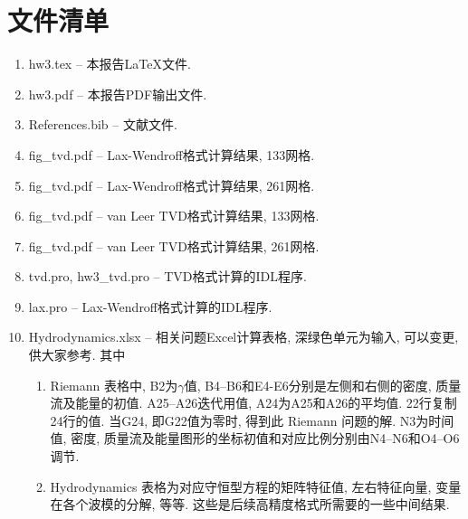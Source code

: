 \documentclass[10.5pt
]{article}
\begin{document}
\section*{文件清单}
\begin{enumerate}
\item
hw3.tex -- 本报告\LaTeX 文件.
\item
hw3.pdf -- 本报告PDF输出文件.
\item
References.bib -- 文献文件.
\item
fig\_tvd.pdf -- Lax-Wendroff格式计算结果, 133网格.
\item
fig\_tvd.pdf -- Lax-Wendroff格式计算结果, 261网格.
\item
fig\_tvd.pdf -- van Leer TVD格式计算结果, 133网格.
\item
fig\_tvd.pdf -- van Leer TVD格式计算结果, 261网格.
\item 
tvd.pro, hw3\_tvd.pro -- TVD格式计算的IDL程序.
\item 
lax.pro -- Lax-Wendroff格式计算的IDL程序.
\item
Hydrodynamics.xlsx -- 相关问题Excel计算表格, 深绿色单元为输入, 可以变更, 供大家参考. 其中
\begin{enumerate}
\item
Riemann 表格中, B2为$\gamma$值, B4--B6和E4-E6分别是左侧和右侧的密度, 质量流及能量的初值. A25--A26迭代用值, A24为A25和A26的平均值. 22行复制24行的值. 当G24, 即G22值为零时, 得到此 Riemann 问题的解. N3为时间值, 密度, 质量流及能量图形的坐标初值和对应比例分别由N4--N6和O4--O6调节.
\item
Hydrodynamics 表格为对应守恒型方程的矩阵特征值, 左右特征向量, 变量在各个波模的分解, 等等. 这些是后续高精度格式所需要的一些中间结果.
\end{enumerate}
\end{enumerate}



\end{document}

